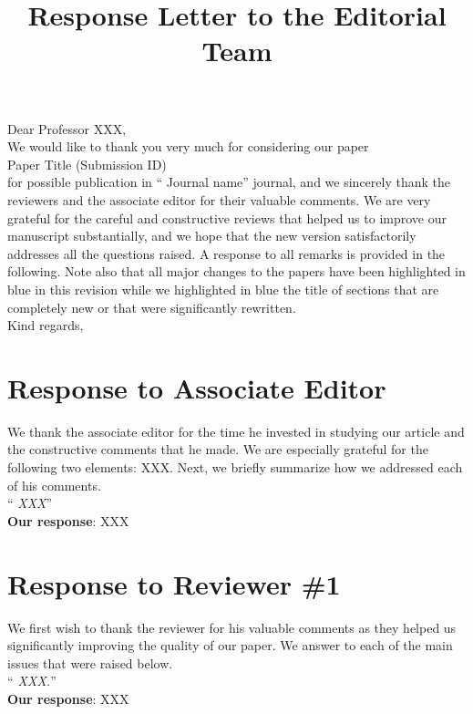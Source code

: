 \documentclass[11pt]{article}
\title{Response Letter to the Editorial Team}
\author{}
\date{}
\newcommand{\0}{\V{0}}
\newcommand{\1}{\V{1}}
\newcommand{\quoteIt}[1]{``#1''}
\newcommand{\tomodify}[1]{{\color{red} #1}}
\newcommand{\ReviewerSay}[1]{\noindent\quoteIt{\emph{#1}}\\}
\newcommand{\OurAnswer}[1]{\noindent \textbf{Our response}: #1\\}
\begin{document}
\maketitle

\noindent Dear Professor \tomodify{XXX},\\[5mm]
We would like to thank you very much for considering our paper\\[3mm]
{
Paper Title (Submission ID)\\[3mm]
}
for possible publication in \quoteIt{\tomodify{Journal name}} journal, and we sincerely thank the reviewers and the associate editor for their valuable comments. We are very grateful for the careful and constructive reviews that helped us to improve our manuscript substantially, and we hope that the new version satisfactorily addresses all the questions raised. A response to all remarks is provided in the following.  Note also that all major changes to the papers have been highlighted in blue in this revision while we highlighted in blue the title of sections that are completely new or that were significantly rewritten.\\

\noindent Kind regards,\\[3mm]

\noindent \tomodify{Authors' names}
\newpage
\section{Response to Associate Editor}

We thank the associate editor for the time he invested in studying our article and the constructive comments that he made. We are especially grateful for the following two elements: \tomodify{XXX}. Next, we briefly summarize how we addressed each of his comments.\\

\ReviewerSay{\tomodify{XXX}}  


\OurAnswer{\tomodify{XXX}}

\newpage
\section{Response to Reviewer \#1}

We first wish to thank the reviewer for his valuable comments as they helped us significantly improving the quality of our paper. We answer to each of the main issues that were raised below.\\

\ReviewerSay{\tomodify{XXX}.}

\OurAnswer{\tomodify{XXX}}



 

\end{document}
